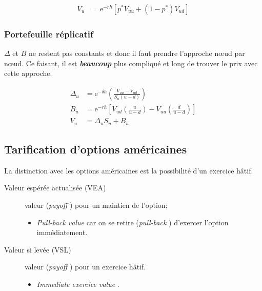 \documentclass[10pt, french]{article}
\begin{document}
\begin{multicols*}{2}
\begin{distributions}
\begin{align*}
	V_{u}	&=	\textrm{e}^{-r h}\left[ p^{*}V_{uu} + (1 - p^{*})V_{ud} \right]
\end{align*}
\end{distributions}

\subsubsection*{Portefeuille réplicatif}

$\Delta$ et $B$ ne restent pas constants et donc il faut prendre l'approche nœud par nœud. Ce faisant, il est \textit{\textbf{beaucoup}} plus compliqué et long de trouver le prix avec cette approche.

\begin{distributions}
\begin{align*}
	\Delta_{u}	&=	\textrm{e}^{-\delta h}\left( \frac{V_{uu} - V_{ud}}{S_{u}(u - d)} \right)	\\
	B_{u}	&=	\textrm{e}^{-r h} \left[ V_{ud}\left(	\frac{u}{u - d}\right) - V_{uu} \left(\frac{d}{u - d}\right) \right]	\\
	V_{u}	&=	\Delta_{u} S_{u} + B_{u}
\end{align*}
\end{distributions}

\columnbreak
\subsection{Tarification d'options américaines}
La distinction avec les options américaines est la possibilité d'un exercice hâtif.

\begin{description}
	\item[Valeur espérée actualisée (VEA)]	valeur (\og \textit{payoff} \fg{}) pour un maintien de l'option;
		\begin{itemize}[leftmargin = *]
		\item	\og \textit{Pull-back value}\fg{} car on se retire (\og \textit{pull-back} \fg{}) d'exercer l'option immédiatement.
		\end{itemize}
	\item[Valeur si levée (VSL)]	valeur (\og \textit{payoff} \fg{}) pour un exercice hâtif.
		\begin{itemize}[leftmargin = *]
		\item	\og \textit{Immediate exercice value} \fg{}.
		\end{itemize}
\end{description}


\end{multicols*}
\end{document}
